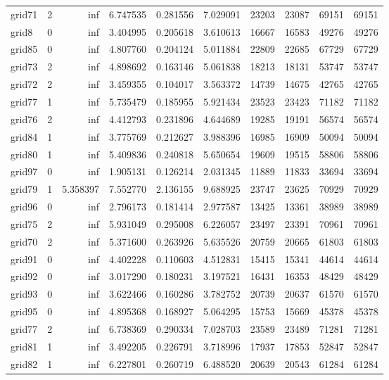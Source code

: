 \begin{longtable}{|l|r|r|r|r|r|r|r|r|r|}
grid71 & 2 & inf & 6.747535 & 0.281556 & 7.029091 & 23203 & 23087 & 69151 & 69151 \\
grid8 & 0 & inf & 3.404995 & 0.205618 & 3.610613 & 16667 & 16583 & 49276 & 49276 \\
grid85 & 0 & inf & 4.807760 & 0.204124 & 5.011884 & 22809 & 22685 & 67729 & 67729 \\
grid73 & 2 & inf & 4.898692 & 0.163146 & 5.061838 & 18213 & 18131 & 53747 & 53747 \\
grid72 & 2 & inf & 3.459355 & 0.104017 & 3.563372 & 14739 & 14675 & 42765 & 42765 \\
grid77 & 1 & inf & 5.735479 & 0.185955 & 5.921434 & 23523 & 23423 & 71182 & 71182 \\
grid76 & 2 & inf & 4.412793 & 0.231896 & 4.644689 & 19285 & 19191 & 56574 & 56574 \\
grid84 & 1 & inf & 3.775769 & 0.212627 & 3.988396 & 16985 & 16909 & 50094 & 50094 \\
grid80 & 1 & inf & 5.409836 & 0.240818 & 5.650654 & 19609 & 19515 & 58806 & 58806 \\
grid97 & 0 & inf & 1.905131 & 0.126214 & 2.031345 & 11889 & 11833 & 33694 & 33694 \\
grid79 & 1 & 5.358397 & 7.552770 & 2.136155 & 9.688925 & 23747 & 23625 & 70929 & 70929 \\
grid96 & 0 & inf & 2.796173 & 0.181414 & 2.977587 & 13425 & 13361 & 38989 & 38989 \\
grid75 & 2 & inf & 5.931049 & 0.295008 & 6.226057 & 23497 & 23391 & 70961 & 70961 \\
grid70 & 2 & inf & 5.371600 & 0.263926 & 5.635526 & 20759 & 20665 & 61803 & 61803 \\
grid91 & 0 & inf & 4.402228 & 0.110603 & 4.512831 & 15415 & 15341 & 44614 & 44614 \\
grid92 & 0 & inf & 3.017290 & 0.180231 & 3.197521 & 16431 & 16353 & 48429 & 48429 \\
grid93 & 0 & inf & 3.622466 & 0.160286 & 3.782752 & 20739 & 20637 & 61570 & 61570 \\
grid95 & 0 & inf & 4.895368 & 0.168927 & 5.064295 & 15753 & 15669 & 45378 & 45378 \\
grid77 & 2 & inf & 6.738369 & 0.290334 & 7.028703 & 23589 & 23489 & 71281 & 71281 \\
grid81 & 1 & inf & 3.492205 & 0.226791 & 3.718996 & 17937 & 17853 & 52847 & 52847 \\
grid82 & 1 & inf & 6.227801 & 0.260719 & 6.488520 & 20639 & 20543 & 61284 & 61284 \\

\end{longtable}
